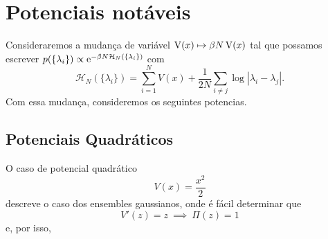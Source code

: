 \section{Potenciais notáveis}

Consideraremos a mudança de variável $\operatorname{V}(x) \mapsto \beta N \operatorname{V}(x)$ tal que possamos escrever $p(\{ \lambda_i\}) \propto \operatorname{\textrm e}^{-\beta N \mathcal{H}_N(\{ \lambda_i\})}$ com $$\mathcal{H}_N(\{ \lambda_i\}) = \sum_{i = 1}^{N} V(x) + \frac{1}{2N} \sum_{i \neq j} \log{|\lambda_i - \lambda_j|}.$$ Com essa mudança, consideremos os seguintes potencias.





\subsection{Potenciais Quadráticos}

O caso de potencial quadrático $$V(x) = \frac{x^2}{2}$$ descreve o caso dos ensembles gaussianos, onde é fácil determinar que $$V'(z) = z \ \implies \ \Pi(z) = 1$$ e, por isso, 




